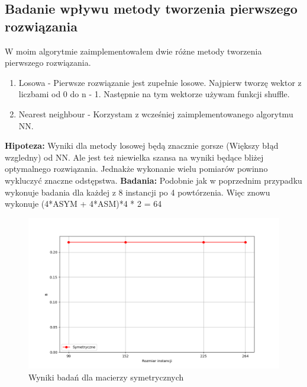 \documentclass{article}
\begin{document}
      \subsection{Badanie wpływu metody tworzenia pierwszego rozwiązania}
        W moim algorytmie zaimplementowałem dwie różne metody tworzenia pierwszego rozwiązania.
        \begin{enumerate}
          \item Losowa - Pierwsze rozwiązanie jest zupełnie losowe. Najpierw tworzę wektor z liczbami
          od 0 do n - 1. Następnie na tym wektorze używam funkcji shuffle. 
          \item Nearest neighbour - Korzystam z wcześniej zaimplementowanego algorytmu NN. 
        \end{enumerate}
        \textbf{Hipoteza: } Wyniki dla metody losowej będą znacznie gorsze (Większy błąd wzgledny) od NN.
        Ale jest też niewielka szansa na wyniki będące bliżej optymalnego rozwiązania. Jednakże wykonanie
        wielu pomiarów powinno wykluczyć znaczne odstępstwa.\linebreak
        \textbf{Badania: } Podobnie jak w poprzednim przypadku wykonuje badania dla każdej z 8 instancji
        po 4 powtórzenia. Więc znowu wykonuje (4*ASYM + 4*ASM)*4 * 2 = 64\linebreak
        \begin{figure}[ht]
          \centering
          \includegraphics[width=\textwidth]{src/plots/symtest.png}
          \caption{Wyniki badań dla macierzy symetrycznych}
          \label{fig:symFirst}
        \end{figure}
        \FloatBarrier
\end{document}
